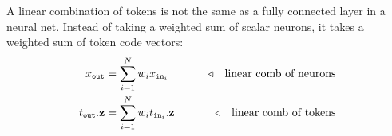 A linear combination of tokens is not the same as a fully connected layer in a neural net. Instead of taking a weighted sum of scalar neurons, it takes a weighted sum of token code vectors: %
\begin{align}
    x_{\texttt{out}} &= \sum_{i=1}^N w_{i}x_{\texttt{in}_i} \quad\quad &\triangleleft \quad \text{linear comb of neurons}\\
    t_{\texttt{out}}.\mathbf{z} &= \sum_{i=1}^N w_{i} t_{\texttt{in}_i}.\mathbf{z} \quad\quad &\triangleleft \quad \text{linear comb of tokens} \label{eqn:transformers:lin_comb_tokens}
\end{align}
\vspace{-15pt}
